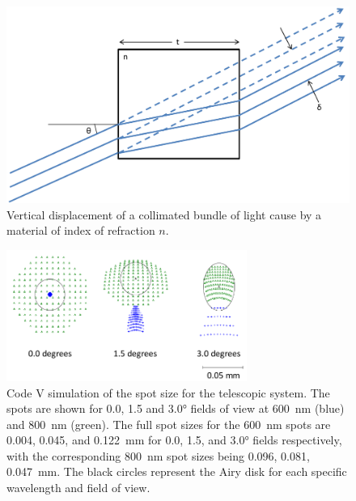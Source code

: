 \begin{figure}
    \begin{center}
    \includegraphics[width=1.0\textwidth]{./Images/3-2-PlaneParallelDisplacement.pdf}
    \caption[Telescoptic Plane Parallel Displacement]{Vertical displacement of a collimated bundle of light cause by a material of index of refraction $n$.}
    \label{fig:3.2:planeParallelDiplacement}
    \end{center}
\end{figure}

\begin{figure}
    \begin{center}
    \includegraphics[width=0.70\textwidth]{./Images/3-2-TelescopicSpotSize.pdf}
    \caption[Telescopic Prototype Spot Sizes]{Code V simulation of the spot size for the telescopic system. The spots are shown for 0.0, 1.5 and 3.0\si{\degree} fields of view at 600~nm (blue) and 800~nm (green). The full spot sizes for the 600~nm spots are 0.004, 0.045, and 0.122~mm for 0.0, 1.5, and 3.0\si{\degree} fields respectively, with the corresponding 800~nm spot sizes being 0.096, 0.081, 0.047~mm. The black circles represent the Airy disk for each specific wavelength and field of view.}
    \label{fig:3.2:telescopicSpotSize}
    \end{center}
\end{figure}

